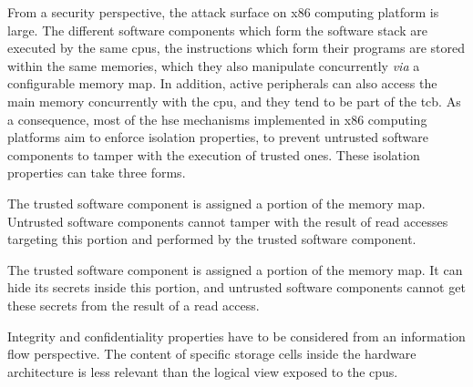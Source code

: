 From a security perspective, the attack surface on x86 computing platform is
large.
%
%
The different software components which form the software stack are executed by
the same \acp{cpu}, the instructions which form their programs are stored within
the same memories, which they also manipulate concurrently \emph{via} a
configurable memory map.
%
In addition, active peripherals can also access the main memory concurrently
with the \ac{cpu}, and they tend to be part of the \ac{tcb}.
%
%
As a consequence, most of the \ac{hse} mechanisms implemented in x86 computing
platforms aim to enforce isolation properties, to prevent untrusted software
 components to tamper with the
execution of trusted ones.
%
These isolation properties can take three forms.

\begin{definition}[Integrity]
  \label{def:usecase:int}
  The trusted software component is assigned a portion of the memory map.
  Untrusted software components cannot tamper with the result of read accesses
  targeting this portion and performed by the trusted software component.
\end{definition}

\begin{definition}[Confidentiality]
  The trusted software component is assigned a portion of the memory map.
  It can hide its secrets inside this portion, and untrusted software components
  cannot get these secrets from the result of a read access.
\end{definition}

Integrity and confidentiality properties have to be considered from an
information flow perspective.
%
The content of specific storage cells inside the hardware architecture is less
relevant than the logical view exposed to the \acp{cpu}.
%

